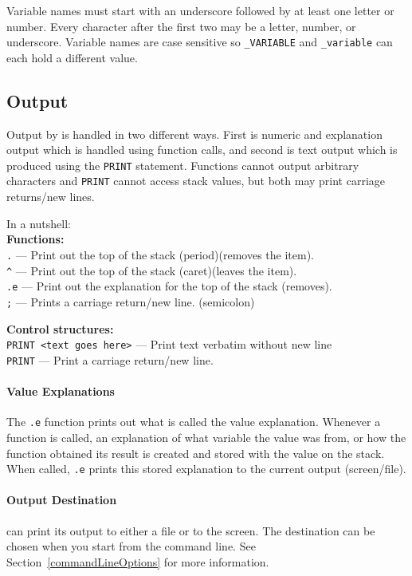 Variable names must start with an underscore followed by at least one letter
or number. Every character after the first two may be a letter, number, or
underscore. Variable names are case sensitive so \texttt{\_VARIABLE} and
\texttt{\_variable} can each hold a different value.

\subsection{Output}
\label{output}
Output by \progLogo is handled in two different ways. First is numeric and
explanation output which is handled using function calls, and second is
text output which is produced using the \texttt{PRINT} statement. Functions
cannot output arbitrary characters and \texttt{PRINT} cannot access stack
values, but both may print carriage returns/new lines.

\noindent In a nutshell:\\
\textbf{Functions:}\\
\texttt{.} --- Print out the top of the stack (period)(removes the item).\\
\texttt{\^} --- Print out the top of the stack (caret)(leaves the item).\\
\texttt{.e} --- Print out the explanation for the top of the stack (removes).\\
\texttt{;} --- Prints a carriage return/new line. (semicolon)

\noindent\textbf{Control structures:}\\
\texttt{PRINT <text goes here>} --- Print text verbatim without new line\\
\texttt{PRINT} --- Print a carriage return/new line.

\paragraph*{Value Explanations\\}
\hspace*{\parindent}%
The \texttt{.e} function prints out what is called the value explanation.
Whenever a function is called, an explanation of what variable the value was
from, or how the function obtained its result is created and stored with the
value on the stack. When called, \texttt{.e} prints this stored explanation
to the current output (screen/file).

\paragraph*{Output Destination\\}
\hspace*{\parindent}%
\progLogo can print its output to either a file or to the screen.
The destination can be chosen when you start \progLogo from the command line.
See Section~\ref{commandLineOptions} for more information.


